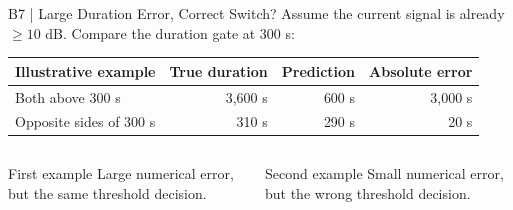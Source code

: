 \begin{frame}[noframenumbering]{B7 | Large Duration Error, Correct Switch?}
\small Assume the current signal is already $\geq10$ dB. Compare the duration gate at 300 s:\par
\vspace{4mm}
\renewcommand{\arraystretch}{1.6}
\begin{tabularx}{\textwidth}{@{}Xrrr@{}}
\toprule
Illustrative example & True duration & Prediction & Absolute error\\\midrule
Both above 300 s & 3,600 s & 600 s & \textcolor{alertred}{3,000 s}\\
Opposite sides of 300 s & 310 s & 290 s & \textcolor{current}{20 s}\\
\bottomrule
\end{tabularx}\par
\vspace{4mm}
\begin{columns}[T,onlytextwidth]
\begin{block}{First example}
Large numerical error, but the same threshold decision.
\end{block}
\begin{block}{Second example}
Small numerical error, but the wrong threshold decision.
\end{block}
\end{columns}
\end{frame}

